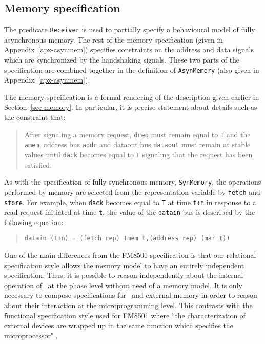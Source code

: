 \subsection{Memory specification}

The predicate \verb"Receiver" is used to partially specify a
behavioural model of fully asynchronous memory.
The rest of the memory specification
(given in Appendix~\ref{apx-asynmem})
specifies constraints on the address and data signals which
are synchronized by the handshaking signals.
These two parts of the specification are combined together
in the definition of \verb"AsynMemory"
(also given in Appendix~\ref{apx-asynmem}).

The memory specification is a formal rendering of the
description given earlier in Section~\ref{sec-memory}.
In particular,
it is precise statement about details such as the constraint
that:

\begin{quotation}
After signaling a memory request,
\verb"dreq" must remain equal to \verb"T"
and the \verb"wmem", address bus \verb"addr" and dataout bus \verb"dataout"
must remain at stable values until \verb"dack" becomes equal to \verb"T"
signaling that the request has been satisfied.
\end{quotation}

As with the specification of fully synchronous memory, \verb"SynMemory",
the operations performed by memory are selected from the representation
variable by \verb"fetch" and \verb"store".
For example, when \verb"dack" becomes equal to \verb"T"
at time \verb"t+n"
in response to a read request initiated at time \verb"t",
the value of the \verb"datain" bus is described by the following equation:

\begin{quote}
\verb"datain (t+n) = (fetch rep) (mem t,(address rep) (mar t))"
\end{quote}

One of the main differences from the FM8501
specification \cite{Hunt:thesis} is that our relational specification style
allows the memory model to have an entirely independent specification.
Thus, it is possible to reason independently about
the internal operation of
\Tamarack\ at the phase level without need of a memory model.
It is only necessary to compose specifications for \Tamarack\
and external memory
in order to reason about their interaction at the microprogramming level.
This contrasts with the functional specification style used for FM8501
where ``the characterization of external devices are wrapped up
in the same function which specifies the microprocessor" \cite{Hunt:thesis}.


